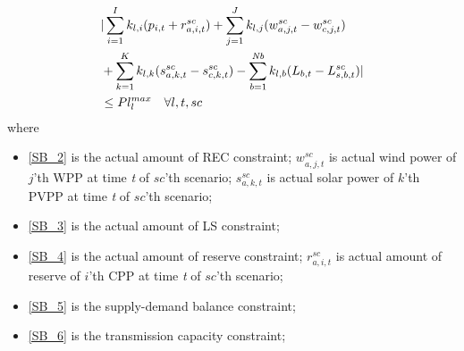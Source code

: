 \begin{equation} \label{SB_6}
\begin{aligned}
\begin{aligned}
\begin{aligned}
&|\sum_{i=1}^{I}k_{l,i}(p_{i,t}+r_{a,i,t}^{sc})+\sum_{j=1}^{J}k_{l,j}(w_{a,j,t}^{sc}-w_{c,j,t}^{sc}) \\
&+\sum_{k=1}^{K}k_{l,k}(s_{a,k,t}^{sc}-s_{c,k,t}^{sc})-\sum_{{\it b}=1}^{{\it Nb}}k_{l,b}(L_{b,t}-L_{s,b,t}^{sc})|\\ & \le  Pl_l^{max} \quad \forall l,t,sc
\end{aligned}
\end{aligned}
\end{aligned}
\end{equation}
where
\begin{itemize}

	\item \eqref{SB_2} is the actual amount of REC constraint; $w_{a,j,t}^{sc}$ is actual wind power of $j$'th WPP at time {\it t} of $sc$'th scenario; $s_{a,k,t}^{sc}$ is actual solar power of $k$'th PVPP at time {\it t} of $sc$'th scenario;

	\item \eqref{SB_3} is the actual amount of LS constraint;

	\item \eqref{SB_4} is the actual amount of reserve constraint; $r_{a,i,t}^{sc}$ is actual amount of reserve of $i$'th CPP at time {\it t} of $sc$'th scenario;

	\item \eqref{SB_5} is the supply-demand balance constraint;

	\item \eqref{SB_6} is the transmission capacity constraint;


\end{itemize}

